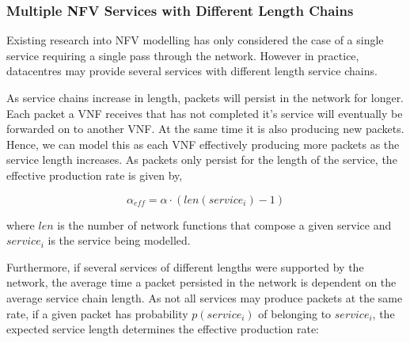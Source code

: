 \subsubsection{Multiple NFV Services with Different Length Chains} \label{multiple}
Existing research into NFV modelling has only considered the case of a single service requiring a single pass through the network. However in practice, datacentres may provide several services with different length service chains.


As service chains increase in length, packets will persist in the network for longer. Each packet a VNF receives that has not completed it's service will eventually be forwarded on to another VNF. At the same time it is also producing new packets. Hence, we can model this as each VNF effectively producing more packets as the service length increases. As packets only persist for the length of the service, the effective production rate is given by,

\begin{equation}
\label{eq:alpha_eff_single}
\alpha_{eff} = \alpha \cdot (len(service_i) - 1)
\end{equation}

\noindent where $len$ is the number of network functions that compose a given service and $service_i$ is the service being modelled.

Furthermore, if several services of different lengths were supported by the network, the average time a packet persisted in the network is dependent on the average service chain length. As not all services may produce packets at the same rate, if a given packet has probability $p(service_i)$ of belonging to $service_i$, the expected service length determines the effective production rate:

